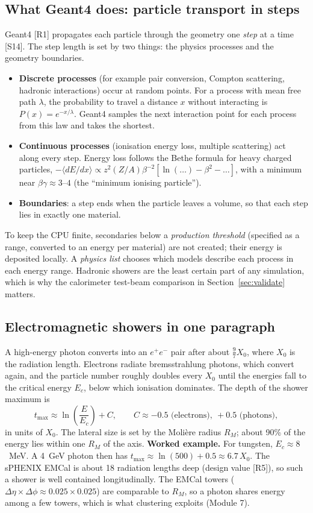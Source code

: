 \documentclass[11pt,letterpaper]{article}
\begin{document}
\subsection{What Geant4 does: particle transport in steps}
Geant4 [R1] propagates each particle through the geometry one \emph{step} at a time [S14].
The step length is set by two things: the physics processes and the geometry boundaries.
\begin{itemize}
\item \textbf{Discrete processes} (for example pair conversion, Compton scattering, hadronic interactions) occur at random points.
For a process with mean free path $\lambda$, the probability to travel a distance $x$ without interacting is $P(x)=e^{-x/\lambda}$.
Geant4 samples the next interaction point for each process from this law and takes the shortest.
\item \textbf{Continuous processes} (ionisation energy loss, multiple scattering) act along every step. Energy loss follows the Bethe formula
for heavy charged particles, $-\langle dE/dx\rangle \propto z^2 (Z/A)\beta^{-2}[\ln(\ldots)-\beta^2-\ldots]$, with a minimum near $\beta\gamma\approx3$--$4$ (the ``minimum ionising particle'').
\item \textbf{Boundaries}: a step ends when the particle leaves a volume, so that each step lies in exactly one material.
\end{itemize}
To keep the CPU finite, secondaries below a \emph{production threshold} (specified as a range, converted to an energy per material) are not created; their energy is deposited locally.
A \emph{physics list} chooses which models describe each process in each energy range. Hadronic showers are the least certain part of any simulation,
which is why the calorimeter test-beam comparison in Section~\ref{sec:validate} matters.

\subsection{Electromagnetic showers in one paragraph}
A high-energy photon converts into an $e^+e^-$ pair after about $\frac{9}{7}X_0$, where $X_0$ is the radiation length.
Electrons radiate bremsstrahlung photons, which convert again, and the particle number roughly doubles every $X_0$ until the energies fall to the critical energy $E_c$,
below which ionisation dominates. The depth of the shower maximum is
\begin{equation}
t_{\max} \approx \ln\!\left(\frac{E}{E_c}\right) + C, \qquad C\approx -0.5 \text{ (electrons)}, \ +0.5 \text{ (photons)},
\end{equation}
in units of $X_0$. The lateral size is set by the Moli\`ere radius $R_M$; about 90\% of the energy lies within one $R_M$ of the axis.
\textbf{Worked example.} For tungsten, $E_c\approx 8$~MeV. A 4~GeV photon then has $t_{\max}\approx\ln(500)+0.5\approx 6.7\,X_0$.
The sPHENIX EMCal is about 18 radiation lengths deep (design value [R5]), so such a shower is well contained longitudinally.
The EMCal towers ($\Delta\eta\times\Delta\phi\approx0.025\times0.025$) are comparable to $R_M$, so a photon shares energy among a few towers, which is what clustering exploits (Module 7).
\end{document}
